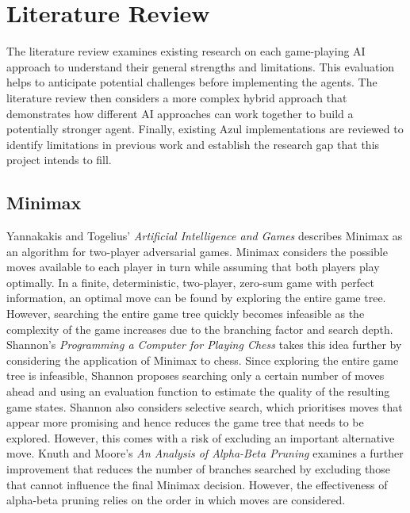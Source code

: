 \section{Literature Review}
The literature review examines existing research on each game-playing AI approach to understand their general strengths and limitations. This evaluation helps to anticipate potential challenges before implementing the agents. The literature review then considers a more complex hybrid approach that demonstrates how different AI approaches can work together to build a potentially stronger agent. Finally, existing Azul implementations are reviewed to identify limitations in previous work and establish the research gap that this project intends to fill. 

\subsection{Minimax}
Yannakakis and Togelius' \emph{Artificial Intelligence and Games} \cite{yannakakis2025artificial} describes Minimax as an algorithm for two-player adversarial games. Minimax considers the possible moves available to each player in turn while assuming that both players play optimally. In a finite, deterministic, two-player, zero-sum game with perfect information, an optimal move can be found by exploring the entire game tree. However, searching the entire game tree quickly becomes infeasible as the complexity of the game increases due to the branching factor and search depth. \\

Shannon's \emph{Programming a Computer for Playing Chess} \cite{shannonminimaxchess} takes this idea further by considering the application of Minimax to chess. Since exploring the entire game tree is infeasible, Shannon proposes searching only a certain number of moves ahead and using an evaluation function to estimate the quality of the resulting game states. Shannon also considers selective search, which prioritises moves that appear more promising and hence reduces the game tree that needs to be explored. However, this comes with a risk of excluding an important alternative move. Knuth and Moore's \emph{An Analysis of Alpha-Beta Pruning} \cite{knuthalphabeta} examines a further improvement that reduces the number of branches searched by excluding those that cannot influence the final Minimax decision. However, the effectiveness of alpha-beta pruning relies on the order in which moves are considered. \\

